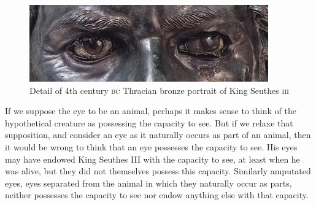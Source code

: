 \begin{figure}[htbp]
	\centering
		\includegraphics[scale=1]{graphics/seuthesiii.jpg}
	\caption{Detail of 4th century \textsc{bc} Thracian bronze portrait of King Seuthes \textsc{iii}}
	\label{fig:seuthesiii}
\end{figure}

If we suppose the eye to be an animal, perhaps it makes sense to think of the hypothetical creature as possessing the capacity to see. But if we relaxe that supposition, and consider an eye as it naturally occurs as part of an animal, then it would be wrong to think that an eye possesses the capacity to see. His eyes may have endowed King Seuthes III with the capacity to see, at least when he was alive, but they did not themselves possess this capacity. Similarly amputated eyes, eyes separated from the animal in which they naturally occur as parts, neither possesses the capacity to see nor endow anything else with that capacity. 

